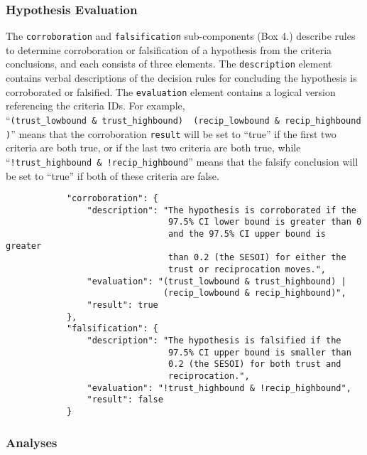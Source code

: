 \documentclass[english,doc,floatsintext]{apa6}
\begin{document}
\hypertarget{hypothesis-evaluation}{%
\subsubsection{Hypothesis Evaluation}\label{hypothesis-evaluation}}

The \texttt{corroboration} and \texttt{falsification} sub-components (Box 4.) describe rules to determine corroboration or falsification of a hypothesis from the criteria conclusions, and each consists of three elements. The \texttt{description} element contains verbal descriptions of the decision rules for concluding the hypothesis is corroborated or falsified. The \texttt{evaluation} element contains a logical version referencing the criteria IDs. For example, \enquote{\texttt{(trust\_lowbound\ \&\ trust\_highbound)\ \textbar{}\ (recip\_lowbound\ \&\ recip\_highbound)}} means that the corroboration \texttt{result} will be set to \enquote{true} if the first two criteria are both true, or if the last two criteria are both true, while \enquote{\texttt{!trust\_highbound\ \&\ !recip\_highbound}} means that the falsify conclusion will be set to \enquote{true} if both of these criteria are false.

\begin{tcolorbox}[colback=black!5!white,colframe=white!5!black,title=Box 4. Corroboration and falsification rules.]
\begin{verbatim}
            "corroboration": {
                "description": "The hypothesis is corroborated if the
                                97.5% CI lower bound is greater than 0
                                and the 97.5% CI upper bound is greater
                                than 0.2 (the SESOI) for either the
                                trust or reciprocation moves.",
                "evaluation": "(trust_lowbound & trust_highbound) |
                               (recip_lowbound & recip_highbound)",
                "result": true
            },
            "falsification": {
                "description": "The hypothesis is falsified if the
                                97.5% CI upper bound is smaller than
                                0.2 (the SESOI) for both trust and
                                reciprocation.",
                "evaluation": "!trust_highbound & !recip_highbound",
                "result": false
            }
\end{verbatim}
\end{tcolorbox}

\hypertarget{analyses}{%
\subsubsection{Analyses}\label{analyses}}
\end{document}
